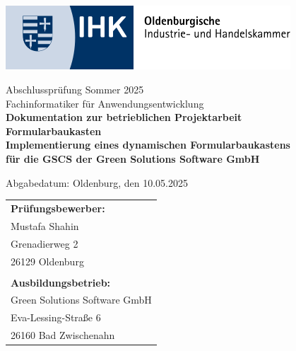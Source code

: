 \documentclass[a4paper,11pt]{article}
\begin{document}
\pagestyle{fancy}
\fancyhf{}
\fancyfoot[C]{\thepage}
\renewcommand{\headrulewidth}{0.4pt}
\renewcommand{\footrulewidth}{0.4pt}

\begin{titlepage}
\thispagestyle{empty}

\begin{center}
\includegraphics[width=0.8\textwidth]{ihk_logo}

\vspace{0.5cm}
{\large Abschlussprüfung Sommer 2025}\\
\vspace{0.5cm}
{\large Fachinformatiker für Anwendungsentwicklung}\\
\vspace{1cm}
{\Large\textbf{Dokumentation zur betrieblichen Projektarbeit}}\\
\vspace{1cm}
{\Huge\textbf{Formularbaukasten}}\\
\vspace{0.5cm}
{\Large\textbf{Implementierung eines dynamischen Formularbaukastens}}\\
\vspace{0.1cm}
{\Large\textbf{für die GSCS der Green Solutions Software GmbH}}\\
\end{center}

\vspace{0.3cm}
\begin{center}
{\large Abgabedatum: Oldenburg, den 10.05.2025}
\end{center}

\vspace{0.3cm}
\begin{center}
\begin{tabular}{l}
{\large\textbf{Prüfungsbewerber:}}\\
{\large Mustafa Shahin}\\
{\large Grenadierweg 2}\\
{\large 26129 Oldenburg}\\
\\
{\large\textbf{Ausbildungsbetrieb:}}\\
{\large Green Solutions Software GmbH}\\
{\large Eva-Lessing-Straße 6}\\
{\large 26160 Bad Zwischenahn}
\end{tabular}
\end{center}


\end{titlepage}
\end{document}
